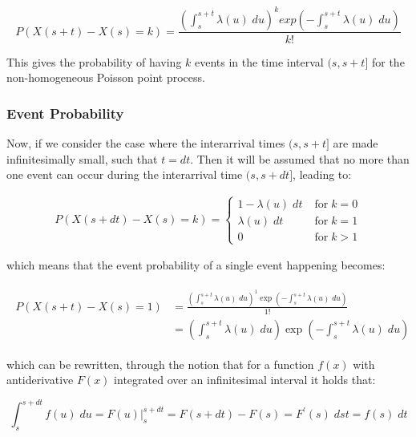 \begin{equation}
    P(X(s+t) - X(s) = k) = \frac{\left(\int_s^{s+t} \lambda(u) \; du \right)^k exp\left(-\int_s^{s+t} \lambda(u) \; du\right)}{k!}
\end{equation}

This gives the probability of having $k$ events in the time interval $(s, s+t]$ for the non-homogeneous Poisson point process.


\subsubsection{Event Probability}
\label{sec:Method:Poisson:EventProbability}

Now, if we consider the case where the interarrival times $(s, s+t]$ are made infinitesimally small, such that $t = dt$. 
Then it will be assumed that no more than one event can occur during the interarrival time $(s, s+dt]$, leading to:

\begin{align}
P(X(s+dt) - X(s) = k) = 
\begin{cases}
    1 - \lambda(u) \; dt \; &\text{for} \; k=0 \\
    \lambda(u) \; dt \; &\text{for} \; k=1 \\
    0 \; &\text{for} \; k > 1
\end{cases}
\end{align}

which means that the event probability of a single event happening becomes:

\begin{align}
\begin{split}
    P(X(s+t) - X(s) = 1) 
    &= 
    \frac{\left(\int_s^{s+t} \lambda(u) \; du \right)^1 \exp \left(-\int_s^{s+t} \lambda(u) \; du\right)}{1!} \\
    &= 
    \left(\int_s^{s+t} \lambda(u) \; du \right) \exp \left(-\int_s^{s+t} \lambda(u) \; du\right)
\label{prob_single_event}
\end{split}
\end{align}


which can be rewritten, through the notion that for a function $f(x)$ with antiderivative $F(x)$ integrated over an infinitesimal interval it holds that:

\begin{equation}
    \int_s^{s+dt} f(u) \; du = F(u) \rvert_s^{s+dt} = F(s+dt) - F(s) = F^{\prime}(s) \; dst = f(s) \; dt
\end{equation}

